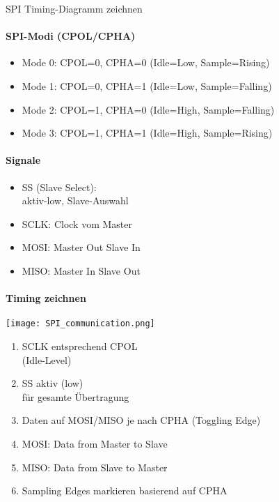 \begin{KR}{SPI Timing-Diagramm zeichnen}

    \begin{minipage}{0.6\linewidth}
    \paragraph{SPI-Modi (CPOL/CPHA)}
    \begin{itemize}
        \item Mode 0: CPOL=0, CPHA=0 (Idle=Low, Sample=Rising)
        \item Mode 1: CPOL=0, CPHA=1 (Idle=Low, Sample=Falling)
        \item Mode 2: CPOL=1, CPHA=0 (Idle=High, Sample=Falling)
        \item Mode 3: CPOL=1, CPHA=1 (Idle=High, Sample=Rising)
    \end{itemize}
    \end{minipage}
    \hspace{2mm}
    \begin{minipage}{0.35\linewidth}    
    \paragraph{Signale}
    \begin{itemize}
        \item SS (Slave Select): \\ aktiv-low, Slave-Auswahl
        \item SCLK: Clock vom Master
        \item MOSI: Master Out Slave In
        \item MISO: Master In Slave Out
    \end{itemize}
    \end{minipage}
    
    \paragraph{Timing zeichnen}

    \begin{minipage}{0.6\linewidth}
    \texttt{[image: SPI\_communication.png]}
    \end{minipage}
    \begin{minipage}{0.35\linewidth}
    \begin{enumerate}
        \item SCLK entsprechend CPOL \\ (Idle-Level)
        \item SS aktiv (low) \\ für gesamte Übertragung
        \item Daten auf MOSI/MISO je nach CPHA (Toggling Edge)
        \item MOSI: Data from Master to Slave
        \item MISO: Data from Slave to Master
        \item Sampling Edges markieren basierend auf CPHA
    \end{enumerate}
    \end{minipage}


\end{KR}
